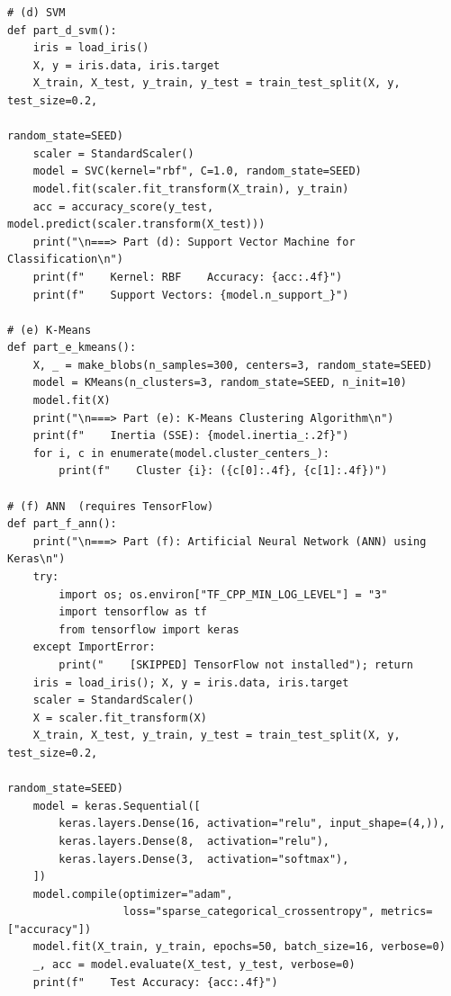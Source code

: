 \documentclass[12pt,a4paper]{article}
\begin{document}
\begin{lstlisting}
# (d) SVM
def part_d_svm():
    iris = load_iris()
    X, y = iris.data, iris.target
    X_train, X_test, y_train, y_test = train_test_split(X, y, test_size=0.2,
                                                         random_state=SEED)
    scaler = StandardScaler()
    model = SVC(kernel="rbf", C=1.0, random_state=SEED)
    model.fit(scaler.fit_transform(X_train), y_train)
    acc = accuracy_score(y_test, model.predict(scaler.transform(X_test)))
    print("\n===> Part (d): Support Vector Machine for Classification\n")
    print(f"    Kernel: RBF    Accuracy: {acc:.4f}")
    print(f"    Support Vectors: {model.n_support_}")

# (e) K-Means
def part_e_kmeans():
    X, _ = make_blobs(n_samples=300, centers=3, random_state=SEED)
    model = KMeans(n_clusters=3, random_state=SEED, n_init=10)
    model.fit(X)
    print("\n===> Part (e): K-Means Clustering Algorithm\n")
    print(f"    Inertia (SSE): {model.inertia_:.2f}")
    for i, c in enumerate(model.cluster_centers_):
        print(f"    Cluster {i}: ({c[0]:.4f}, {c[1]:.4f})")

# (f) ANN  (requires TensorFlow)
def part_f_ann():
    print("\n===> Part (f): Artificial Neural Network (ANN) using Keras\n")
    try:
        import os; os.environ["TF_CPP_MIN_LOG_LEVEL"] = "3"
        import tensorflow as tf
        from tensorflow import keras
    except ImportError:
        print("    [SKIPPED] TensorFlow not installed"); return
    iris = load_iris(); X, y = iris.data, iris.target
    scaler = StandardScaler()
    X = scaler.fit_transform(X)
    X_train, X_test, y_train, y_test = train_test_split(X, y, test_size=0.2,
                                                         random_state=SEED)
    model = keras.Sequential([
        keras.layers.Dense(16, activation="relu", input_shape=(4,)),
        keras.layers.Dense(8,  activation="relu"),
        keras.layers.Dense(3,  activation="softmax"),
    ])
    model.compile(optimizer="adam",
                  loss="sparse_categorical_crossentropy", metrics=["accuracy"])
    model.fit(X_train, y_train, epochs=50, batch_size=16, verbose=0)
    _, acc = model.evaluate(X_test, y_test, verbose=0)
    print(f"    Test Accuracy: {acc:.4f}")


\end{lstlisting}
\end{document}
